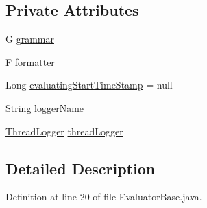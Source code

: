 \subsection*{Private Attributes}
\begin{DoxyCompactItemize}
\item 
G \hyperlink{classit_1_1emarolab_1_1cagg_1_1core_1_1evaluation_1_1interfacing_1_1EvaluatorBase_3_01G_01extendd61d057930241954f97ab0cbf4992dd1_ad5f00bd710a38f621f91b7a1c2d63472}{grammar}
\item 
F \hyperlink{classit_1_1emarolab_1_1cagg_1_1core_1_1evaluation_1_1interfacing_1_1EvaluatorBase_3_01G_01extendd61d057930241954f97ab0cbf4992dd1_a3b45e169a4152cf6a81d6f8a0e60d6bc}{formatter}
\item 
Long \hyperlink{classit_1_1emarolab_1_1cagg_1_1core_1_1evaluation_1_1interfacing_1_1EvaluatorBase_3_01G_01extendd61d057930241954f97ab0cbf4992dd1_a9118cdd9e5192faca3e7c3d97c9fc81c}{evaluating\-Start\-Time\-Stamp} = null
\item 
String \hyperlink{classit_1_1emarolab_1_1cagg_1_1core_1_1evaluation_1_1interfacing_1_1EvaluatorBase_3_01G_01extendd61d057930241954f97ab0cbf4992dd1_a6ae36ff2beb31486da6c87d845616155}{logger\-Name}
\item 
\hyperlink{classit_1_1emarolab_1_1cagg_1_1core_1_1evaluation_1_1CaggThread_1_1ThreadLogger}{Thread\-Logger} \hyperlink{classit_1_1emarolab_1_1cagg_1_1core_1_1evaluation_1_1interfacing_1_1EvaluatorBase_3_01G_01extendd61d057930241954f97ab0cbf4992dd1_a559fb61baeafd47b0f1cec2a6e5924b4}{thread\-Logger}
\end{DoxyCompactItemize}


\subsection{Detailed Description}


Definition at line 20 of file Evaluator\-Base.\-java.



